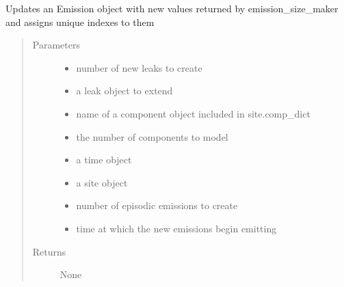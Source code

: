 \documentclass[letterpaper,10pt,english]{sphinxmanual}
\begin{document}
\begin{fulllineitems}

\begin{fulllineitems}
\label{\detokenize{index:feast.EmissionSimModules.infrastructure_classes.GasField.emission_maker}}
Updates an Emission object with new values returned by emission\_size\_maker and assigns unique indexes to them
\begin{quote}\begin{description}
\item[{Parameters}] \leavevmode\begin{itemize}
\item {} 
 \textendash{} number of new leaks to create

\item {} 
 \textendash{} a leak object to extend

\item {} 
 \textendash{} name of a component object included in site.comp\_dict

\item {} 
 \textendash{} the number of components to model

\item {} 
 \textendash{} a time object

\item {} 
 \textendash{} a site object

\item {} 
 \textendash{} number of episodic emissions to create

\item {} 
 \textendash{} time at which the new emissions begin emitting

\end{itemize}

\item[{Returns}] \leavevmode
None


\end{description}
\end{quote}
\end{fulllineitems}
\end{fulllineitems}
\end{document}
